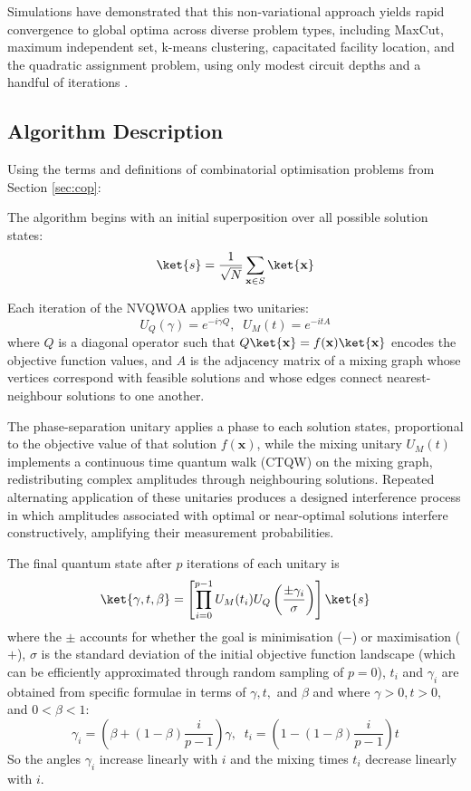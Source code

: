 Simulations have demonstrated that this non-variational approach yields rapid convergence to global optima across diverse problem types, including MaxCut, maximum independent set, k-means clustering, capacitated facility location, and the quadratic assignment problem, using only modest circuit depths and a handful of iterations \cite{bennett2024analysisnonvariationalquantumwalkbased}.

\subsection{Algorithm Description}
Using the terms and definitions of combinatorial optimisation problems from Section \ref{sec:cop}:

The algorithm begins with an initial superposition over all possible solution states:
$$\ket{s}=\frac{1}{\sqrt{N}}\sum_{\mathbf{x}\in S}\ket{\mathbf{x}}$$

Each iteration of the NVQWOA applies two unitaries:
$$U_Q(\gamma)=e^{-i\gamma Q},\;\;U_M(t)=e^{-itA}$$
where $Q$ is a diagonal operator such that $Q\ket{\mathbf{x}}=f(\mathbf{x})\ket{\mathbf{x}}$ encodes the objective function values, and $A$ is the adjacency matrix of a mixing graph whose vertices correspond with feasible solutions and whose edges connect nearest-neighbour solutions to one another.

The phase-separation unitary applies a phase to each solution states, proportional to the objective value of that solution $f(\mathbf{x})$, while the mixing unitary $U_M(t)$ implements a continuous time quantum walk (CTQW) on the mixing graph, redistributing complex amplitudes through neighbouring solutions. Repeated alternating application of these unitaries produces a designed interference process in which amplitudes associated with optimal or near-optimal solutions interfere constructively, amplifying their measurement probabilities.

The final quantum state after $p$ iterations of each unitary is
$$\ket{\gamma,t,\beta}=\left[\prod_{i=0}^{p-1} U_M(t_i)U_Q\left(\frac{\pm \gamma_i}{\sigma}\right)\right] \ket{s}$$
where the $\pm$ accounts for whether the goal is minimisation ($-$) or maximisation ($+$), $\sigma$ is the standard deviation of the initial objective function landscape (which can be efficiently approximated through random sampling of $p=0$), $t_i$ and $\gamma_i$ are obtained from specific formulae in terms of $\gamma, t,$ and $\beta$ and where $\gamma>0, t>0,$ and $0<\beta<1$:
$$\gamma_i=\left(\beta + (1-\beta)\frac{i}{p-1} \right)\gamma,\;\;t_i=\left(1- (1-\beta)\frac{i}{p-1} \right)t$$
So the angles $\gamma_i$ increase linearly with $i$ and the mixing times $t_i$ decrease linearly with $i$.

